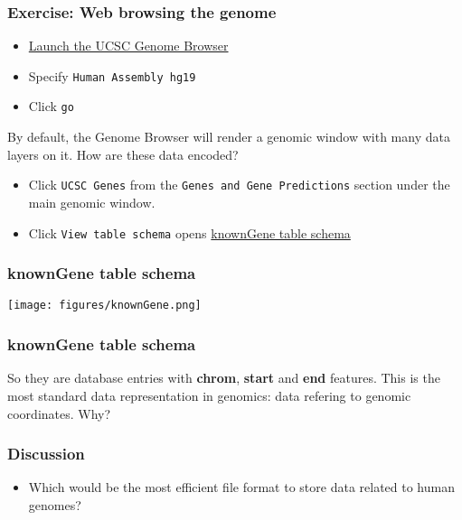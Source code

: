 \documentclass{beamer}
\begin{document}
\begin{frame}
  \frametitle{Exercise: Web browsing the genome}
  \begin{itemize}
  \item \href{https://genome-euro.ucsc.edu/cgi-bin/hgGateway}{Launch the UCSC Genome Browser}
  \item  Specify \texttt{Human Assembly hg19}    
  \item Click \texttt{go}
  \end{itemize}

  By default, the Genome Browser will render a genomic window with many data layers on it. How are these data encoded?

  \begin{itemize}
  \item Click \texttt{UCSC Genes} from the \texttt{Genes and Gene Predictions} section under the main genomic window.
  \item  Click \texttt{View table schema} opens \href{https://genome-euro.ucsc.edu/cgi-bin/hgTables?db=hg19&hgta_group=genes&hgta_track=knownGene&hgta_table=knownGene&hgta_doSchema=describe+table+schema}{knownGene table schema}
    \end{itemize}

  \end{frame}

  \begin{frame}
    \frametitle{knownGene table schema}
\texttt{[image: figures/knownGene.png]}

  \end{frame}


  \begin{frame}
    \frametitle{knownGene table schema}

So they are database entries with \textbf{chrom}, \textbf{start} and \textbf{end} features. This is the most standard data representation in genomics: data refering to genomic coordinates. Why?

  \end{frame}



  \begin{frame}
    \frametitle{Discussion}
    \begin{itemize}
    \item Which would be the most efficient file format to store data related to human genomes?

    \end{itemize}

  \end{frame}
\end{document}
